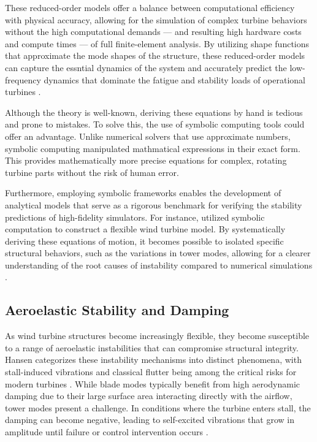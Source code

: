 \documentclass[onecolumn,draftcls]{IEEEtran}
\begin{document}
These reduced-order models offer a balance between computational efficiency with physical accuracy, allowing for the simulation of complex turbine behaviors without the high computational demands — and resulting high hardware costs and compute times — of full finite-element analysis. By utilizing shape functions that approximate the mode shapes of the structure, these reduced-order models can capture the essntial dynamics of the system and accurately predict the low-frequency dynamics that dominate the fatigue and stability loads of operational turbines \cite{branlard2019flexible}.

Although the theory is well-known, deriving these equations by hand is tedious and prone to mistakes. To solve this, the use of symbolic computing tools could offer an advantage. Unlike numerical solvers that use approximate numbers, symbolic computing manipulated mathmatical expressions in their exact form. This provides mathematically more precise equations for complex, rotating turbine parts without the risk of human error.

Furthermore, employing symbolic frameworks enables the development of analytical models that serve as a rigorous benchmark for verifying the stability predictions of high-fidelity simulators. For instance, \cite{riva2013analytical} utilized symbolic computation to construct a flexible wind turbine model. By systematically deriving these equations of motion, it becomes possible to isolated specific structural behaviors, such as the variations in tower modes, allowing for a clearer understanding of the root causes of instability compared to numerical simulations \cite{riva2013analytical}.

\subsection*{Aeroelastic Stability and Damping}
As wind turbine structures become increasingly flexible, they become susceptible to a range of aeroelastic instabilities that can compromise structural integrity. Hansen categorizes these instability mechanisms into distinct phenomena, with stall-induced vibrations and classical flutter being among the critical risks for modern turbines \cite{hansen2007aeroelastic}. While blade modes typically benefit from high aerodynamic damping due to their large surface area interacting directly with the airflow, tower modes present a challenge. In conditions where the turbine enters stall, the damping can become negative, leading to self-excited vibrations that grow in amplitude until failure or control intervention occurs \cite{hansen2007aeroelastic}.
\end{document}
